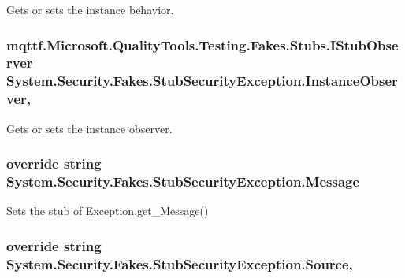 Gets or sets the instance behavior.

\hypertarget{class_system_1_1_security_1_1_fakes_1_1_stub_security_exception_adea8ae855fab5580a3d2dd6a7a05fc17}{
\subsubsection[{Instance\-Observer}]{\setlength{\rightskip}{0pt plus 5cm}mqttf.\-Microsoft.\-Quality\-Tools.\-Testing.\-Fakes.\-Stubs.\-I\-Stub\-Observer System.\-Security.\-Fakes.\-Stub\-Security\-Exception.\-Instance\-Observer\hspace{0.3cm}{\ttfamily [get]}, {\ttfamily [set]}}}\label{class_system_1_1_security_1_1_fakes_1_1_stub_security_exception_adea8ae855fab5580a3d2dd6a7a05fc17}


Gets or sets the instance observer.

\hypertarget{class_system_1_1_security_1_1_fakes_1_1_stub_security_exception_a132c80f0ee6fbacc1adecccd78373aa7}{
\subsubsection[{Message}]{\setlength{\rightskip}{0pt plus 5cm}override string System.\-Security.\-Fakes.\-Stub\-Security\-Exception.\-Message\hspace{0.3cm}{\ttfamily [get]}}}\label{class_system_1_1_security_1_1_fakes_1_1_stub_security_exception_a132c80f0ee6fbacc1adecccd78373aa7}


Sets the stub of Exception.\-get\-\_\-\-Message()

\hypertarget{class_system_1_1_security_1_1_fakes_1_1_stub_security_exception_a30de26bb9d11a5c5863ddbfb4ff2c597}{
\subsubsection[{Source}]{\setlength{\rightskip}{0pt plus 5cm}override string System.\-Security.\-Fakes.\-Stub\-Security\-Exception.\-Source\hspace{0.3cm}{\ttfamily [get]}, {\ttfamily [set]}}}\label{class_system_1_1_security_1_1_fakes_1_1_stub_security_exception_a30de26bb9d11a5c5863ddbfb4ff2c597}


